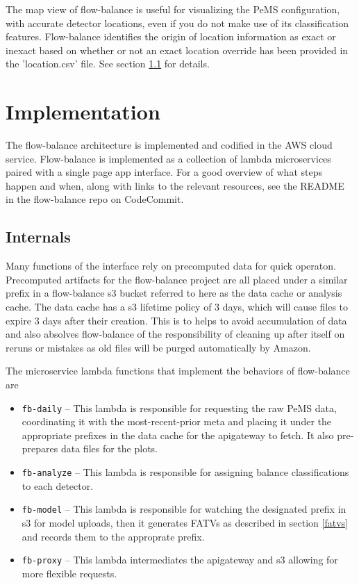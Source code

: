 \documentclass[titlepage]{article}
\begin{document}
The map view of flow-balance is useful for visualizing the PeMS configuration, with accurate detector locations, even if you do not make use of its classification features. Flow-balance identifies the origin of location information as exact or inexact based on whether or not an exact location override has been provided in the 'location.csv' file. See section \ref{internals} for details.

\section{Implementation}\label{implementation}
The flow-balance architecture is implemented and codified in the AWS cloud service. Flow-balance is implemented as a collection of lambda microservices paired with a single page app interface. For a good overview of what steps happen and when, along with links to the relevant resources, see the README in the flow-balance repo on CodeCommit.

\subsection{Internals}\label{internals}
Many functions of the interface rely on precomputed data for quick operaton. Precomputed artifacts for the flow-balance project are all placed under a similar prefix in a flow-balance s3 bucket referred to here as the data cache or analysis cache. The data cache has a s3 lifetime policy of 3 days, which will cause files to expire 3 days after their creation. This is to helps to avoid accumulation of data and also absolves flow-balance of the responsibility of cleaning up after itself on reruns or mistakes as old files will be purged automatically by Amazon.

The microservice lambda functions that implement the behaviors of flow-balance are
\begin{itemize}
	\item \texttt{fb-daily} --
		This lambda is responsible for requesting the raw PeMS data, coordinating it with the most-recent-prior meta and placing it under the appropriate prefixes in the data cache for the apigateway to fetch. It also pre-prepares data files for the plots.

	\item \texttt{fb-analyze} --
		This lambda is responsible for assigning balance classifications to each detector.

	\item \texttt{fb-model} --
		This lambda is responsible for watching the designated prefix in s3 for model uploads, then it generates FATVs as described in section \ref{fatvs} and records them to the approprate prefix.

	\item \texttt{fb-proxy} --
		This lambda intermediates the apigateway and s3 allowing for more flexible requests.
\end{itemize}
\end{document}
